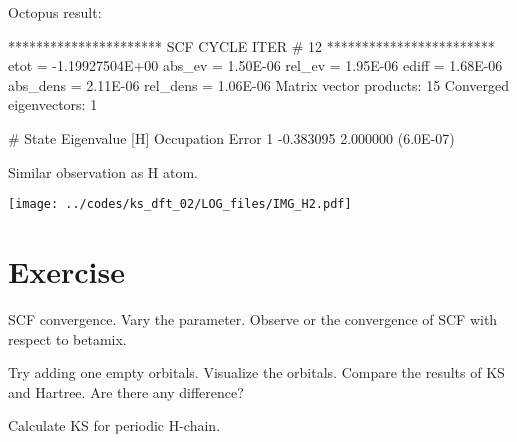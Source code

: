Octopus result:
\begin{fullwidth}
\begin{textcode}
********************** SCF CYCLE ITER #   12 ************************
 etot  = -1.19927504E+00 abs_ev   =  1.50E-06 rel_ev   =  1.95E-06
 ediff =        1.68E-06 abs_dens =  2.11E-06 rel_dens =  1.06E-06
Matrix vector products:     15
Converged eigenvectors:      1

#  State  Eigenvalue [H]  Occupation    Error
      1       -0.383095    2.000000   (6.0E-07) 
\end{textcode}
\end{fullwidth}

Similar observation as H atom.

{\centering
\texttt{[image: ../codes/ks\_dft\_02/LOG\_files/IMG\_H2.pdf]}
}

\section{Exercise}

SCF convergence. Vary the  parameter. Observe or the convergence
of SCF with respect to betamix.

Try adding one empty orbitals. Visualize the orbitals. Compare the results of
KS and Hartree. Are there any difference?

Calculate KS for periodic H-chain.